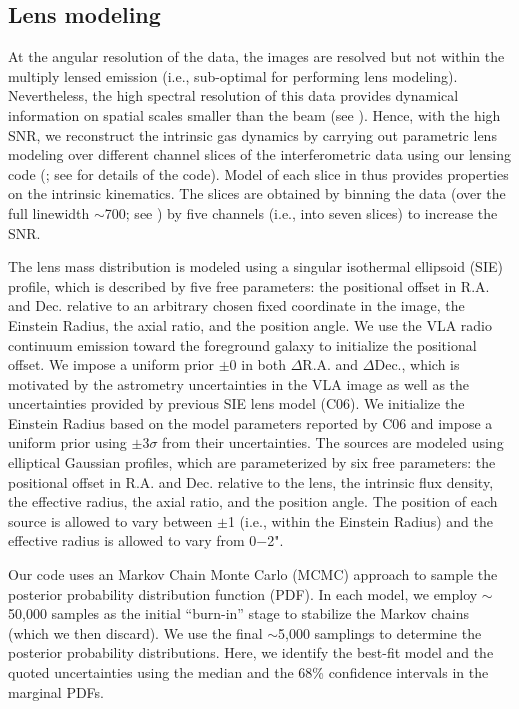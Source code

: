 \documentclass[]{emulateapj}
\begin{document}
\subsection{Lens modeling} \label{sec:lensmodel} %
At the angular resolution of the \bco data, the images are resolved
but not within the multiply lensed emission (i.e., sub-optimal for
performing lens modeling). Nevertheless, the high spectral
resolution of this data provides dynamical information on
spatial scales smaller than the beam (see ).
Hence, with the high SNR, we reconstruct the intrinsic gas
dynamics by carrying out parametric lens modeling over different
channel slices of the interferometric data using our lensing code
\uvmcmcfit (\citealt{uvmcmcfit15a}; see \citealt{Bussmann15a} for details of
the code). Model of each slice in  thus provides
properties on the intrinsic kinematics. The slices
are obtained by binning the data (over the full linewidth
$\sim$700\kms; see ) by five channels (i.e., into seven slices)
 to increase the SNR.

The lens mass distribution is modeled using a singular isothermal
ellipsoid (SIE) profile, which is described by five free parameters: the
positional offset in R.A. and Dec. relative to an arbitrary chosen
fixed coordinate in the image, the Einstein Radius, the axial ratio, and the
position angle. We use the VLA radio continuum emission toward
the foreground galaxy to initialize the positional offset. We impose a
uniform prior $\pm$0 in both $\Delta$R.A. and $\Delta$Dec., which is
motivated by the astrometry uncertainties in the VLA image as well as
the uncertainties provided by previous SIE lens model (C06).
We initialize the Einstein Radius based on the model parameters reported by C06
and impose a uniform prior using $\pm$3$\sigma$ from their uncertainties.
The sources are modeled using elliptical Gaussian profiles, which are
parameterized by six free parameters: the positional offset in R.A.
and Dec. relative to the lens, the intrinsic flux density, the effective
radius, the axial ratio, and the position angle. The position of each source
is allowed to vary between $\pm$1 (i.e., within the Einstein Radius)
and the effective radius is allowed to vary from 0$-$2".

Our code uses an Markov Chain Monte Carlo (MCMC) approach to sample the
posterior probability distribution function (PDF). In each model, we employ
$\sim$50,000 samples as the initial ``burn-in'' stage to stabilize the Markov
chains (which we then discard). We use the final $\sim$5,000
samplings to determine the posterior probability distributions. Here, we
identify the best-fit model and the quoted uncertainties using the
median and the 68\% confidence intervals in the marginal PDFs.
\end{document}
